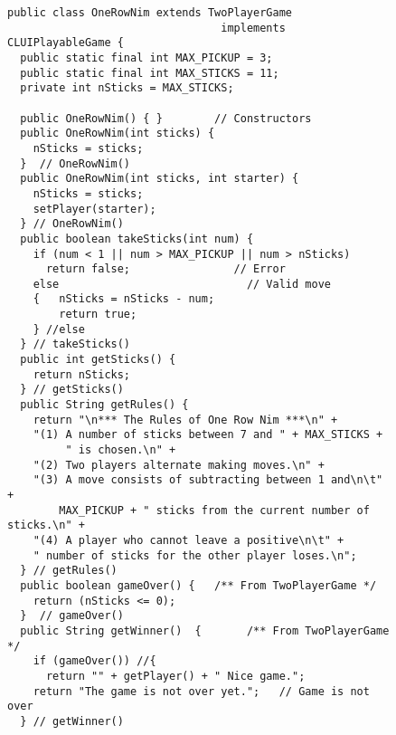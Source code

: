 \begin{figure}[h!]
\jjjprogstart
\begin{jjjlisting}[32pc]
\begin{lstlisting}
public class OneRowNim extends TwoPlayerGame 
                                 implements CLUIPlayableGame {   
  public static final int MAX_PICKUP = 3;
  public static final int MAX_STICKS = 11;
  private int nSticks = MAX_STICKS;

  public OneRowNim() { }        // Constructors
  public OneRowNim(int sticks) {   
    nSticks = sticks;
  }  // OneRowNim()
  public OneRowNim(int sticks, int starter) {   
    nSticks = sticks;
    setPlayer(starter);
  } // OneRowNim()
  public boolean takeSticks(int num) {   
    if (num < 1 || num > MAX_PICKUP || num > nSticks) 
      return false;                // Error
    else                             // Valid move
    {   nSticks = nSticks - num;
        return true;
    } //else
  } // takeSticks()
  public int getSticks() {   
    return nSticks;
  } // getSticks()
  public String getRules() {
    return "\n*** The Rules of One Row Nim ***\n" +
    "(1) A number of sticks between 7 and " + MAX_STICKS + 
         " is chosen.\n" + 
    "(2) Two players alternate making moves.\n" + 
    "(3) A move consists of subtracting between 1 and\n\t" + 
        MAX_PICKUP + " sticks from the current number of sticks.\n" + 
    "(4) A player who cannot leave a positive\n\t" + 
    " number of sticks for the other player loses.\n";
  } // getRules()
  public boolean gameOver() {   /** From TwoPlayerGame */
    return (nSticks <= 0);
  }  // gameOver()
  public String getWinner()  {       /** From TwoPlayerGame */
    if (gameOver()) //{
      return "" + getPlayer() + " Nice game.";
    return "The game is not over yet.";   // Game is not over
  } // getWinner()
\end{lstlisting}
\end{jjjlisting}
\end{figure}

